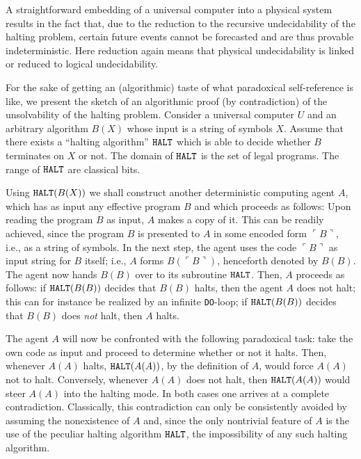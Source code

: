 \documentclass[rmp,amsfonts,showpacs,showkeys]{revtex4}
\begin{document}
A straightforward embedding of a universal computer
into a physical system results in the fact that,
due to the reduction to the recursive undecidability of the halting problem,
certain future events cannot be forecasted
and are thus provable indeterministic.
Here reduction again means that physical undecidability is linked or reduced
to logical undecidability.

For the sake of getting an (algorithmic) taste
of what paradoxical self-reference is like,
we present the sketch of an algorithmic proof (by contradiction)
of the unsolvability of the halting problem.
Consider a universal computer $U$ and  an arbitrary algorithm
$B(X)$ whose input is a string of symbols $X$.  Assume that there exists
a ``halting algorithm'' ${\tt HALT}$ which is able to decide whether $B$
terminates on $X$ or not.
The domain of ${\tt HALT}$  is the set of legal programs.
The range of ${\tt HALT}$ are classical bits.

Using ${\tt HALT}(B(X))$ we shall construct another deterministic
computing agent $A$, which has as input any effective program $B$ and
which proceeds as follows:  Upon reading the program $B$ as input, $A$
makes a copy of it.  This can be readily achieved, since the program $B$
is presented to $A$ in some encoded form
$\ulcorner B\urcorner $,
i.e., as a string of
symbols.  In the next step, the agent uses the code
$\ulcorner B\urcorner $
 as input
string for $B$ itself; i.e., $A$ forms  $B(\ulcorner B\urcorner )$,
henceforth denoted by
$B(B)$.  The agent now hands $B(B)$ over to its subroutine ${\tt HALT}$.
Then, $A$ proceeds as follows:  if ${\tt HALT}(B(B))$ decides that
$B(B)$ halts, then the agent $A$ does not halt; this can for instance be
realized by an infinite {\tt DO}-loop; if ${\tt HALT}(B(B))$ decides
that $B(B)$ does {\em not} halt, then $A$ halts.

The agent $A$ will now be confronted with the following paradoxical
task:  take the own code as input and proceed to determine whether or not it halts.
Then, whenever $A(A)$
halts, ${\tt HALT}(A(A))$, by the definition of $A$, would force $A(A)$ not to halt.
Conversely,
whenever $A(A)$ does not halt, then ${\tt HALT}(A(A))$ would steer
$A(A)$ into the halting mode.  In both cases one arrives at a complete
contradiction.  Classically, this contradiction can only be consistently
avoided by assuming the nonexistence of $A$ and, since the only
nontrivial feature of $A$ is the use of the peculiar halting algorithm
${\tt HALT}$, the impossibility of any such halting algorithm.
\end{document}

